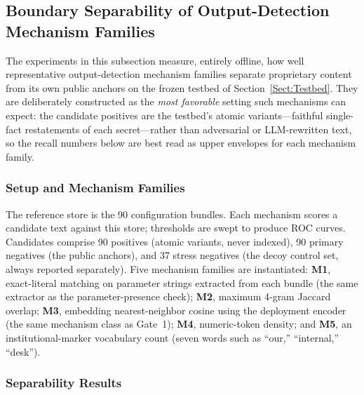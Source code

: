 \documentclass[journal]{IEEEtran}
\begin{document}
\subsection{Boundary Separability of Output-Detection Mechanism Families}
\label{Sect:V_E_BoundaryBench}

The experiments in this subsection measure, entirely offline, how well
representative output-detection mechanism families separate proprietary
content from its own public anchors on the frozen testbed of
Section~\ref{Sect:Testbed}. They are deliberately constructed as the
\emph{most favorable} setting such mechanisms can expect: the candidate
positives are the testbed's atomic variants---faithful single-fact
restatements of each secret---rather than adversarial or LLM-rewritten text,
so the recall numbers below are best read as upper envelopes for each
mechanism family.

\subsubsection{Setup and Mechanism Families}
The reference store is the 90 configuration bundles. Each mechanism scores a
candidate text against this store; thresholds are swept to produce ROC
curves. Candidates comprise 90 positives (atomic variants, never indexed),
90 primary negatives (the public anchors), and 37 stress negatives (the decoy
control set, always reported separately). Five mechanism families are
instantiated: \textbf{M1}, exact-literal matching on parameter strings
extracted from each bundle (the same extractor as the parameter-presence
check); \textbf{M2}, maximum 4-gram Jaccard overlap; \textbf{M3}, embedding
nearest-neighbor cosine using the deployment encoder (the same mechanism class
as Gate~1); \textbf{M4}, numeric-token density; and \textbf{M5}, an
institutional-marker vocabulary count (seven words such as ``our,''
``internal,'' ``desk'').

\subsubsection{Separability Results}
\label{Sect:V_E_1_D1}

\begin{table}[!t]
    \centering
    \caption{Boundary separability by mechanism family (primary negatives = 90 anchors). M1 is a binary mechanism and is reported as a single operating point.}
    \label{Tab:d1_auc}
\end{table}
\end{document}
